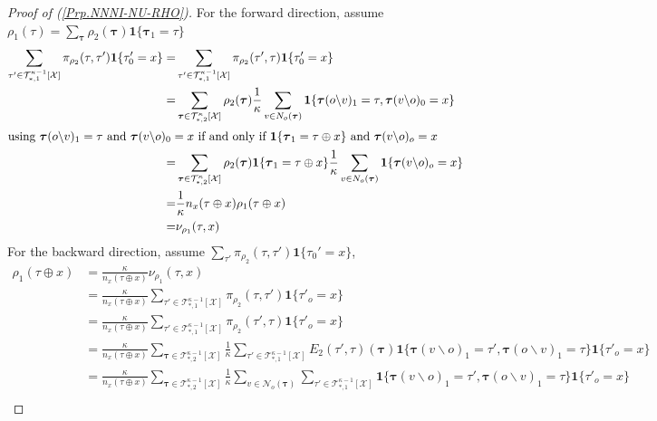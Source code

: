 \documentclass[12pt]{article}
\newcommand{\TB}{{ \boldsymbol\tau}}
\newcommand{\BS}{\backslash}
\newcommand{\X}{{\mathcal{X}}}
\newcommand{\TT}{{\mathcal{T}}}
\newcommand{\one}[1]{\mathbf{1}\{#1\}}
\newcommand{\tree}[2]{\TT_{*, #1}^{#2}[\X]}
\newcommand{\cnt}[1]{{n_{#1}}}
\newcommand{\Sl}{{\rho_2}}
\newcommand{\Ss}{{\rho_1}}
\newcommand{\Sm}{{\nu_{\Ss}}}
\newcommand{\NB}[1]{{\mathcal{N}_o(#1)}}
\numberwithin{equation}{section}
\begin{document}
\begin{proof}[Proof of (\ref{Prp.NNNI-NU-RHO})]
    For the forward direction, assume $\Ss(\tau) = \sum_{\TB}\Sl(\TB)\one{\TB_1=\tau}$
    \begin{align*}
        \sum_{\tau'\in\tree{1}{\kappa-1}}\pi_{\rho_2}(\tau, \tau')\one{\tau_0'=x}
        = & \sum_{\tau'\in\tree{1}{\kappa-1}}\pi_{\rho_2}(\tau', \tau)\one{\tau_0'=x}                                                          \\
        = & \sum_{\TB\in\tree{2}{\kappa}}\rho_2(\TB)\frac1\kappa \sum_{v\in N_o(\TB)}\one{\TB(o\backslash v)_1 = \tau, \TB(v\backslash o)_0=x} \\
        \intertext{using $\TB(o\backslash v)_1 = \tau$ and $\TB(v\backslash o)_0=x$ if and only if $\one{\TB_1 = \tau\oplus x}
            $ and $\TB(v\backslash o)_o=x$}
        = & \sum_{\TB\in\tree{2}{\kappa}}\rho_2(\TB)\one{\TB_1 = \tau\oplus x} \frac1\kappa \sum_{v\in N_o(\TB)}\one{\TB(v\backslash o)_o=x}   \\
        = & \frac1\kappa \cnt{x}(\tau\oplus x)\rho_1(\tau\oplus x)                                                                             \\
        = & \Sm(\tau, x)
    \end{align*}
    For the backward direction, assume $\sum_{\tau'}\pi_{\rho_2}(\tau, \tau')\one{\tau_0'=x}$,
    \begin{align*}
        \rho_1(\tau\oplus x) & = \frac{\kappa}{\cnt{x}(\tau\oplus x)}\Sm(\tau, x)                                                                                                                                                  \\
                             & = \frac{\kappa}{\cnt{x}(\tau\oplus x)}\sum_{\tau'\in\tree{1}{\kappa-1}}\pi_{\rho_2}(\tau, \tau')\one{\tau'_o=x}                                                                                     \\
                             & = \frac{\kappa}{\cnt{x}(\tau\oplus x)}\sum_{\tau'\in\tree{1}{\kappa-1}}\pi_{\rho_2}(\tau', \tau)\one{\tau'_o=x}                                                                                     \\
                             & = \frac{\kappa}{\cnt{x}(\tau\oplus x)}\sum_{\TB\in\tree{2}{\kappa-1}}\frac1\kappa\sum_{\tau'\in\tree{1}{\kappa-1}}E_2(\tau', \tau)(\TB)\one{\TB(v\BS o)_1=\tau', \TB(o\BS v)_1=\tau}\one{\tau'_o=x} \\
                             & = \frac{\kappa}{\cnt{x}(\tau\oplus x)}\sum_{\TB\in\tree{2}{\kappa-1}}\frac1\kappa\sum_{v\in\NB{\TB}}\sum_{\tau'\in\tree{1}{\kappa-1}}\one{\TB(v\BS o)_1=\tau', \TB(o\BS v)_1=\tau}\one{\tau'_o=x}   \\

\end{align*}
\end{proof}
\end{document}
